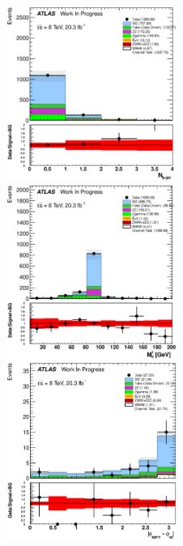 \begin{figure}[ht!]
\centering
\includegraphics[width=0.495\textwidth]{figures/appendix_signal_selection/Nov24Update_FakeSys_KFacSys_LinearY_Rebin/output/jobs/MxM/DataFull_Rates_May13_FakeRatesExactly2Loose_MuonMxMBJetGt0_ElBJetGt0SubtractPC_MxM/PreselectionNov23_15_1SFOS_ChargeAbs1_physics/weight_all/eps/NBTaggedJets_histratio.eps}
\includegraphics[width=0.495\textwidth]{figures/appendix_signal_selection/Nov24Update_FakeSys_KFacSys_LinearY_Rebin/output/jobs/MxM/DataFull_Rates_May13_FakeRatesExactly2Loose_MuonMxMBJetGt0_ElBJetGt0SubtractPC_MxM/PreselectionNov23_15_1SFOS_ChargeAbs1_BVeto85_physics/weight_all/eps/InvariantMassSFOS_histratio.eps}
\includegraphics[width=0.495\textwidth]{figures/appendix_signal_selection/Nov24Update_FakeSys_KFacSys_LinearY_Rebin/output/jobs/MxM/DataFull_Rates_May13_FakeRatesExactly2Loose_MuonMxMBJetGt0_ElBJetGt0SubtractPC_MxM/PreselectionNov23_15_1SFOS_ChargeAbs1_BVeto85_ZVetoLow35High25GeV_METGt45GeV_physics/weight_all/eps/DeltaPhiMET123_Abs_histratio.eps}

\end{figure}
